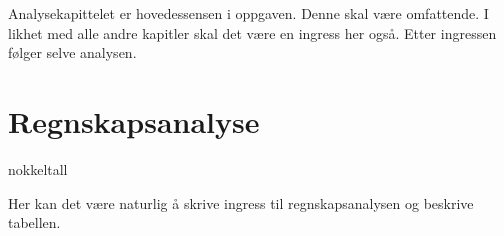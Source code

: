 
Analysekapittelet er hovedessensen i oppgaven. Denne skal være omfattende. I likhet med alle andre kapitler skal det være en ingress her også. Etter ingressen følger selve analysen.

\section{Regnskapsanalyse}
{nokkeltall}

Her kan det være naturlig å skrive ingress til regnskapsanalysen og beskrive tabellen.







